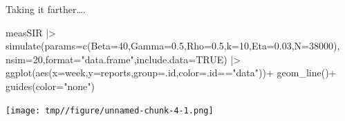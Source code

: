 \documentclass[
  ignorenonframetext,
  aspectratio=169,
  t]{beamer}
\newenvironment{Shaded}{\begin{snugshade}}{\end{snugshade}}
\newcommand{\AttributeTok}[1]{\textcolor[rgb]{0.40,0.45,0.13}{#1}}
\newcommand{\ConstantTok}[1]{\textcolor[rgb]{0.56,0.35,0.01}{#1}}
\newcommand{\DecValTok}[1]{\textcolor[rgb]{0.68,0.00,0.00}{#1}}
\newcommand{\FloatTok}[1]{\textcolor[rgb]{0.68,0.00,0.00}{#1}}
\newcommand{\FunctionTok}[1]{\textcolor[rgb]{0.28,0.35,0.67}{#1}}
\newcommand{\NormalTok}[1]{\textcolor[rgb]{0.00,0.23,0.31}{#1}}
\newcommand{\SpecialCharTok}[1]{\textcolor[rgb]{0.37,0.37,0.37}{#1}}
\newcommand{\StringTok}[1]{\textcolor[rgb]{0.13,0.47,0.30}{#1}}
\theoremstyle{definition}
\begin{document}
\begin{frame}[fragile]
Taking it farther\ldots.

\begin{Shaded}
\begin{Highlighting}[]
\NormalTok{measSIR }\SpecialCharTok{|\textgreater{}}
  \FunctionTok{simulate}\NormalTok{(}\AttributeTok{params=}\FunctionTok{c}\NormalTok{(}\AttributeTok{Beta=}\DecValTok{40}\NormalTok{,}\AttributeTok{Gamma=}\FloatTok{0.5}\NormalTok{,}\AttributeTok{Rho=}\FloatTok{0.5}\NormalTok{,}\AttributeTok{k=}\DecValTok{10}\NormalTok{,}\AttributeTok{Eta=}\FloatTok{0.03}\NormalTok{,}\AttributeTok{N=}\DecValTok{38000}\NormalTok{),}
    \AttributeTok{nsim=}\DecValTok{20}\NormalTok{,}\AttributeTok{format=}\StringTok{"data.frame"}\NormalTok{,}\AttributeTok{include.data=}\ConstantTok{TRUE}\NormalTok{) }\SpecialCharTok{|\textgreater{}}
  \FunctionTok{ggplot}\NormalTok{(}\FunctionTok{aes}\NormalTok{(}\AttributeTok{x=}\NormalTok{week,}\AttributeTok{y=}\NormalTok{reports,}\AttributeTok{group=}\NormalTok{.id,}\AttributeTok{color=}\NormalTok{.id}\SpecialCharTok{==}\StringTok{"data"}\NormalTok{))}\SpecialCharTok{+}
  \FunctionTok{geom\_line}\NormalTok{()}\SpecialCharTok{+}
  \FunctionTok{guides}\NormalTok{(}\AttributeTok{color=}\StringTok{"none"}\NormalTok{)}
\end{Highlighting}
\end{Shaded}

\begin{center}
\texttt{[image: tmp//figure/unnamed-chunk-4-1.png]}
\end{center}
\end{frame}
\end{document}
